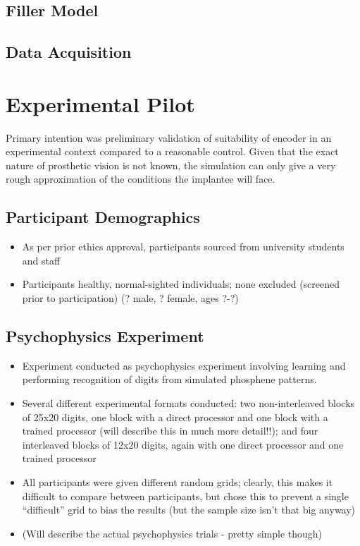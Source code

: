 \documentclass[12pt]{book}
\begin{document}
\subsection{Filler Model}

\subsection{Data Acquisition}

\section{Experimental Pilot}

Primary intention was preliminary validation of suitability of encoder in an experimental context compared to a reasonable control. Given that the exact nature of prosthetic vision is not known, the simulation can only give a very rough approximation of the conditions the implantee will face.

\subsection{Participant Demographics}

\begin{itemize}
  \item As per prior ethics approval, participants sourced from university students and staff
  \item Participants healthy, normal-sighted individuals; none excluded (screened prior to participation) (? male, ? female, ages ?-?)
\end{itemize}

\subsection{Psychophysics Experiment}

\begin{itemize}
  \item Experiment conducted as psychophysics experiment involving learning and performing recognition of digits from simulated phosphene patterns.
  \item Several different experimental formats conducted: two non-interleaved blocks of 25x20 digits, one block with a direct processor and one block with a trained processor (will describe this in much more detail!!); and four interleaved blocks of 12x20 digits, again with one direct processor and one trained processor
  \item All participants were given different random grids; clearly, this makes it difficult to compare between participants, but chose this to prevent a single ``difficult'' grid to bias the results (but the sample size isn't that big anyway)
  \item (Will describe the actual psychophysics trials - pretty simple though)
\end{itemize}
\end{document}
